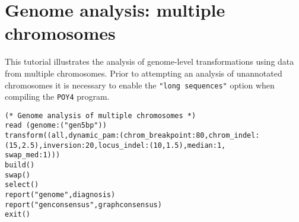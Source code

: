 \section{Genome analysis: multiple chromosomes}{\label{tutorial 9}}

This tutorial illustrates the analysis of genome-level transformations using data from multiple chromosomes. 
Prior to attempting an analysis of unannotated chromosomes it is necessary to enable the \texttt {"long sequences"}
option when compiling the \texttt{POY4} program. 

\begin{verbatim}
(* Genome analysis of multiple chromosomes *)
read (genome:("gen5bp"))
transform((all,dynamic_pam:(chrom_breakpoint:80,chrom_indel:
(15,2.5),inversion:20,locus_indel:(10,1.5),median:1,
swap_med:1)))
build()
swap()
select()
report("genome",diagnosis)
report("genconsensus",graphconsensus)
exit()
\end{verbatim}

